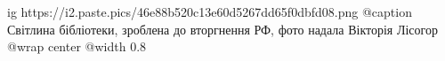  
 
 
 
 

\ifcmt
  ig https://i2.paste.pics/46e88b520c13e60d5267dd65f0dbfd08.png
	@caption Світлина бібліотеки, зроблена до вторгнення РФ, фото надала Вікторія Лісогор
  @wrap center
  @width 0.8
\fi
